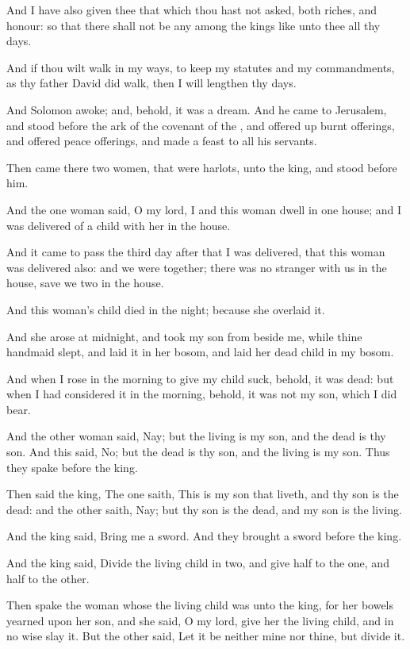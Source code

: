 \Verse And I have also given thee that which thou hast not asked, both riches, and honour: so that there shall not be any among the kings like unto thee all thy days.

\Verse And if thou wilt walk in my ways, to keep my statutes and my commandments, as thy father David did walk, then I will lengthen thy days.

\Verse And Solomon awoke; and, behold, it was a dream. And he came to Jerusalem, and stood before the ark of the covenant of the \LORD, and offered up burnt offerings, and offered peace offerings, and made a feast to all his servants.

\Verse Then came there two women, that were harlots, unto the king, and stood before him.

\Verse And the one woman said, O my lord, I and this woman dwell in one house; and I was delivered of a child with her in the house.

\Verse And it came to pass the third day after that I was delivered, that this woman was delivered also: and we were together; there was no stranger with us in the house, save we two in the house.

\Verse And this woman's child died in the night; because she overlaid it.

\Verse And she arose at midnight, and took my son from beside me, while thine handmaid slept, and laid it in her bosom, and laid her dead child in my bosom.

\Verse And when I rose in the morning to give my child suck, behold, it was dead: but when I had considered it in the morning, behold, it was not my son, which I did bear.

\Verse And the other woman said, Nay; but the living is my son, and the dead is thy son. And this said, No; but the dead is thy son, and the living is my son. Thus they spake before the king.

\Verse Then said the king, The one saith, This is my son that liveth, and thy son is the dead: and the other saith, Nay; but thy son is the dead, and my son is the living.

\Verse And the king said, Bring me a sword. And they brought a sword before the king.

\Verse And the king said, Divide the living child in two, and give half to the one, and half to the other.

\Verse Then spake the woman whose the living child was unto the king, for her bowels yearned upon her son, and she said, O my lord, give her the living child, and in no wise slay it. But the other said, Let it be neither mine nor thine, but divide it.

